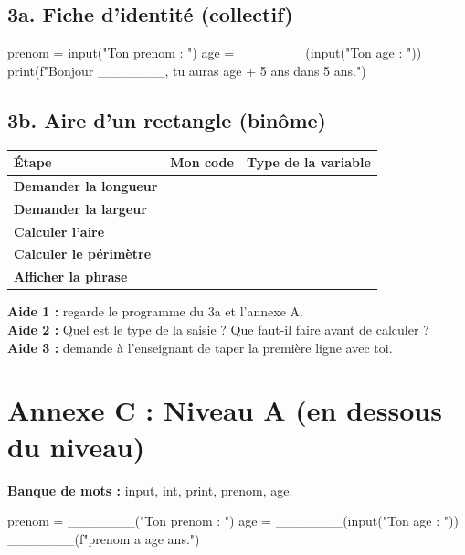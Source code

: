 \documentclass[11pt,a4paper]{article}
\begin{document}
\subsection*{3a. Fiche d'identité (collectif)}
\begin{python}
prenom = input("Ton prenom : ")
age = _______(input("Ton age : "))
print(f"Bonjour {_______}, tu auras {age + 5} ans dans 5 ans.")
\end{python}

\subsection*{3b. Aire d'un rectangle (binôme)}
\begin{tabularx}{\linewidth}{>{\bfseries}p{3.6cm}Y Y}
\toprule
Étape & Mon code & Type de la variable\\
\midrule
Demander la longueur & & \\
Demander la largeur & & \\
Calculer l'aire & & \\
Calculer le périmètre & & \\
Afficher la phrase & & \\
\bottomrule
\end{tabularx}

\begin{tcolorbox}[colback=yellow!10,colframe=yellow!50!black,title={Cartes d'aide à utiliser dans l'ordre},fonttitle=\bfseries\small]
\textbf{Aide 1 :} regarde le programme du 3a et l'annexe A.\\
\textbf{Aide 2 :} Quel est le type de la saisie ? Que faut-il faire avant de calculer ?\\
\textbf{Aide 3 :} demande à l'enseignant de taper la première ligne avec toi.
\end{tcolorbox}

\newpage
\section*{Annexe C : Niveau A (en dessous du niveau)}

\textbf{Banque de mots :} input, int, print, prenom, age.

\begin{python}[niveauA.py]
prenom = _______("Ton prenom : ")
age = _______(input("Ton age : "))
_______(f"{prenom} a {age} ans.")
\end{python}
\end{document}
